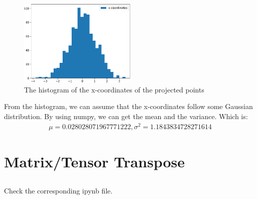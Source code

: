 \documentclass{article}
\begin{document}
\subsection{} %
\begin{figure}[htbp]
    \begin{center}
        \includegraphics[width=0.5\textwidth]{./assist/figure4.6.pdf}
    \caption{The histogram of the x-coordinates of the projected points}
    \end{center}
\end{figure}
From the histogram, we can assume that the x-coordinates follow some Gaussian distribution. By using numpy, we can get the mean and the variance. Which is:
\begin{align*}
    \mu = 0.028028071967771222, \sigma ^2 = 1.1843834728271614
\end{align*}
\section{Matrix/Tensor Transpose}
\subsection{}
Check the corresponding ipynb file.
\end{document}
